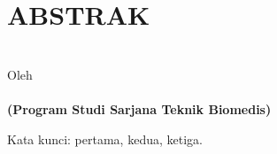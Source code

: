 \clearpage
\chapter*{ABSTRAK}

\begin{center}
	
	\linespread{1}
	\large{\bfseries \MakeUppercase{\thetitle}}
	\\[\baselineskip]
	
	\normalsize{Oleh\\}
	\large{ 
		\bfseries \theauthor\\
		(Program Studi Sarjana Teknik Biomedis)
	}
	\\[2\baselineskip]
	
\end{center}

\blindtext

Kata kunci: pertama, kedua, ketiga.

\clearpage